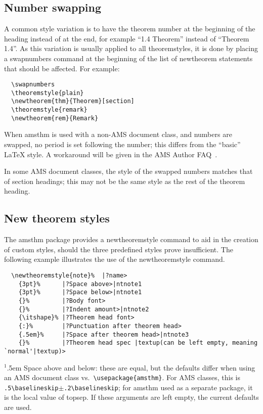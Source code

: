 \documentclass[11pt,twoside]{article}
\providecommand{\qq}[1]{\textquotedblleft#1\textquotedblright}
\newcommand{\ntt}{%
  \fontfamily\ttdefault \fontseries\mddefault \fontshape\updefault
  \selectfont
}
\DeclareRobustCommand{\cn}[1]{{\ntt\bslchar#1}}
\DeclareRobustCommand{\pkg}[1]{{\ntt#1}}
\def\ntnote#1{{\normalfont$^{#1}$}\hangindent.5em}
\def\latex/{{\protect\LaTeX}}
\begin{document}
\subsection{Number swapping}

A common style variation is to have the theorem number at the beginning
of the heading instead of at the end, for example \qq{1.4 Theorem}
instead of \qq{Theorem 1.4}.  As this variation is usually applied
to all \cn{theoremstyle}s, it is done by
placing a \cn{swapnumbers} command at the beginning of the list of
\cn{newtheorem} statements that should be affected. For example:
\begin{verbatim}
  \swapnumbers
  \theoremstyle{plain}
  \newtheorem{thm}{Theorem}[section]
  \theoremstyle{remark}
  \newtheorem{rem}{Remark}
\end{verbatim}

When \pkg{amsthm} is used with a non-AMS document class, and numbers are
swapped, no period is set following the number; this differs from the
``basic'' \latex/ style.  A workaround will be given in the AMS Author
FAQ~\cite{AF}.

In some AMS document classes, the style of the swapped numbers matches
that of section headings; this may not be the same style as the rest
of the theorem heading.


\newpage %

\enlargethispage{1\baselineskip} %
\subsection{New theorem styles}

The \pkg{amsthm} package provides a \cn{newtheoremstyle} command
to aid in the creation of custom styles, should the three predefined
styles prove insufficient.  The following example illustrates the use
of the \cn{newtheoremstyle} command.
\begin{verbatim}
  \newtheoremstyle{note}%  |?name>
    {3pt}%      |?Space above>|ntnote1
    {3pt}%      |?Space below>|ntnote1
    {}%         |?Body font>
    {}%         |?Indent amount>|ntnote2
    {\itshape}% |?Theorem head font>
    {:}%        |?Punctuation after theorem head>
    {.5em}%     |?Space after theorem head>|ntnote3
    {}%         |?Theorem head spec |textup(can be left empty, meaning `normal'|textup)>
\end{verbatim}
\noindent
\ntnote1 Space above and below: these are equal, but the defaults differ
 when using an AMS document class vs.\ \verb+\usepackage{amsthm}+. For
 AMS classes, this is \verb+.5\baselineskip+$\pm$\verb+.2\baselineskip+;
 for \pkg{amsthm} used as a separate package, it is the local value
 of \cn{topsep}.  If these arguments are left empty, the current
 defaults are used.
\end{document}
